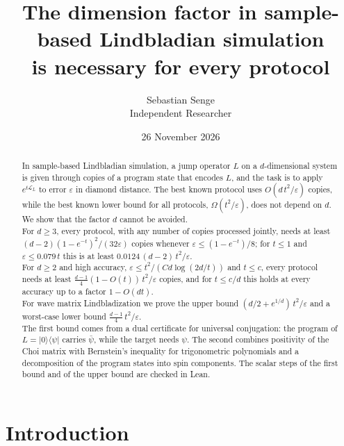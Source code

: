 \documentclass[11pt]{article}
\title{The dimension factor in sample-based Lindbladian simulation\\is necessary for every protocol}
\author{Sebastian Senge\\Independent Researcher}
\date{26 November 2026}
\theoremstyle{remark}
\newcommand{\Lind}{\mathcal{L}}
\newcommand{\ket}[1]{\lvert #1 \rangle}
\newcommand{\bra}[1]{\langle #1 \rvert}
\begin{document}
\maketitle

\begin{abstract}
In sample-based Lindbladian simulation, a jump operator $L$ on a $d$-dimensional system is given through copies of a program state that encodes $L$, and the task is to apply $e^{t\Lind_L}$ to error $\varepsilon$ in diamond distance. The best known protocol uses $O(d\,t^2/\varepsilon)$ copies, while the best known lower bound for all protocols, $\Omega(t^2/\varepsilon)$, does not depend on $d$. We show that the factor $d$ cannot be avoided.\\
For $d \ge 3$, every protocol, with any number of copies processed jointly, needs at least $(d-2)(1-e^{-t})^2/(32\varepsilon)$ copies whenever $\varepsilon \le (1-e^{-t})/8$; for $t \le 1$ and $\varepsilon \le 0.079\,t$ this is at least $0.0124\,(d-2)\,t^2/\varepsilon$.\\
For $d \ge 2$ and high accuracy, $\varepsilon \le t^2/(C d\log(2d/t))$ and $t \le c$, every protocol needs at least $\tfrac{d-1}{4}(1-O(t))\,t^2/\varepsilon$ copies, and for $t \le c/d$ this holds at every accuracy up to a factor $1-O(dt)$.\\
For wave matrix Lindbladization we prove the upper bound $(d/2 + e^{1/d})\,t^2/\varepsilon$ and a worst-case lower bound $\tfrac{d-1}{4}\,t^2/\varepsilon$.\\
The first bound comes from a dual certificate for universal conjugation: the program of $L = \ket{0}\bra{\psi}$ carries $\bar\psi$, while the target needs $\psi$. The second combines positivity of the Choi matrix with Bernstein's inequality for trigonometric polynomials and a decomposition of the program states into spin components. The scalar steps of the first bound and of the upper bound are checked in Lean.
\end{abstract}

\section{Introduction}
\end{document}
